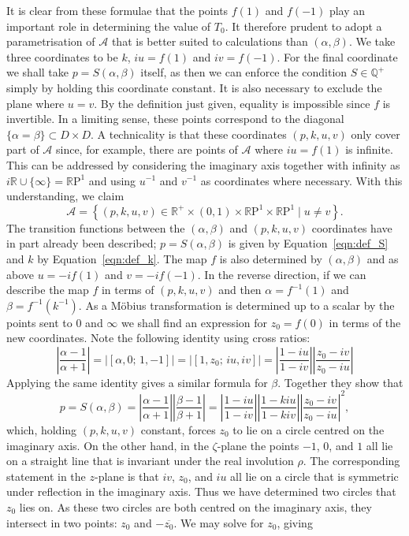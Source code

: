 \documentclass{article}
\numberwithin{equation}{section}
\numberwithin{figure}{section}
\renewcommand*{\bar}{\overline}
\newcommand{\abs}[1]{\left|#1\right|}
\newcommand{\cross}[4]{\left[#1,#2;\, #3, #4\right]}
\newcommand{\iu}{i}
\newcommand{\Q}{\mathbb{Q}}
\newcommand{\R}{\mathbb{R}}
\newcommand{\RP}{\mathbb{R}\text{P}}
\begin{document}
It is clear from these formulae that the points $f(1)$ and $f(-1)$ play an important role in determining the value of $T_0$. It therefore prudent to adopt a parametrisation of $\mathcal{A}$ that is better suited to calculations than $(\alpha,\beta)$. We take three coordinates to be $k$, $\iu u = f(1)$ and $\iu v = f(-1)$. For the final coordinate we shall take $p=S(\alpha,\beta)$ itself, as then we can enforce the condition $S\in\Q^+$ simply by holding this coordinate constant. 
It is also necessary to exclude the plane where $u=v$. By the definition just given, equality is impossible since $f$ is invertible. In a limiting sense, these points correspond to the diagonal $\{\alpha=\beta\} \subset D\times D$. 
A technicality is that these coordinates $(p,k,u,v)$ only cover part of $\mathcal{A}$ since, for example, there are points of $\mathcal{A}$ where $\iu u = f(1)$ is infinite. This can be addressed by considering the imaginary axis together with infinity as $\iu\R\cup\{\infty\}=\RP^1$ and using $u^{-1}$ and $v^{-1}$ as coordinates where necessary. With this understanding, we claim
\[
\mathcal{A} = \left\{ (p,k,u,v) \in \R^+ \times (0,1) \times \RP^1\times \RP^1 \mid u\neq v\right\}.
\]
The transition functions between the $(\alpha, \beta)$ and $(p,k,u,v)$ coordinates have in part already been described; $p = S(\alpha,\beta)$ is given by Equation~\eqref{eqn:def_S} and $k$ by Equation~\eqref{eqn:def_k}. The map $f$ is also determined by $(\alpha,\beta)$ and as above $u = -\iu f(1)$ and $v = -\iu f(-1)$. In the reverse direction, if we can describe the map $f$ in terms of  $(p,k,u,v)$ and then $\alpha = f^{-1}(1)$ and $\beta = f^{-1}(k^{-1})$. As a M\"obius transformation is determined up to a scalar by the points sent to $0$ and $\infty$ we shall find an expression for $z_0 = f(0)$ in terms of the new coordinates. Note the following identity using cross ratios:
\[
\abs{\frac{\alpha-1}{\alpha+1}}
= \abs{ \cross{\alpha}{0}{1}{-1} }
= \abs{ \cross{1}{z_0}{\iu u}{\iu v} }
= \abs{\frac{1-\iu u}{1 - \iu v}} \abs{\frac{z_0 - \iu v}{z_0 - \iu u}}
\]
Applying the same identity gives a similar formula for $\beta$. Together they show that
\[
p = S(\alpha,\beta)
= \abs{\frac{\alpha-1}{\alpha+1}} \abs{\frac{\beta-1}{\beta+1}}
= \abs{\frac{1-\iu u}{1 - \iu v}}\abs{\frac{1 - k\iu u}{1 - k\iu v}} \abs{\frac{z_0 - \iu v}{z_0 - \iu u}}^2,
\]
which, holding $(p,k,u,v)$ constant, forces $z_0$ to lie on a circle centred on the imaginary axis. On the other hand, in the $\zeta$-plane the points $-1$, $0$, and $1$ all lie on a straight line that is invariant under the real involution $\rho$. The corresponding statement in the $z$-plane is that $\iu v$, $z_0$, and $\iu u$ all lie on a circle that is symmetric under reflection in the imaginary axis. Thus we have determined two circles that $z_0$ lies on. As these two circles are both centred on the imaginary axis, they intersect in two points: $z_0$ and $-\bar{z_0}$. We may solve for $z_0$, giving
\end{document}
